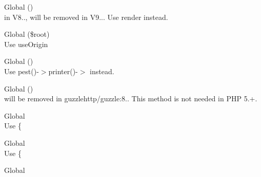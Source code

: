 \begin{DoxyRefList}
\item[Global \doxylink{class_sabberworm_1_1_c_s_s_1_1_value_1_1_u_r_l_a7516ca30af0db3cdbf9a7739b48ce91d}{URL\+::\+\_\+\+\_\+to\+String} ()]\hfill \\
\label{deprecated__deprecated000427}%
%
in V8.., will be removed in V9... Use {\ttfamily render} instead.  
\item[Global \doxylink{class_illuminate_1_1_routing_1_1_url_generator_ad109ef27f934d87ba94e607eb919cdf8}{Url\+Generator\+::force\+Root\+Url} (\$root)]\hfill \\
\label{deprecated__deprecated000123}%
%
Use use\+Origin  
\item[Global \doxylink{class_pest_1_1_pending_calls_1_1_uses_call_a5d9f5a8222144a8fb71f23ab9875eb64}{Uses\+Call\+::compact} ()]\hfill \\
\label{deprecated__deprecated000272}%
%
Use {\ttfamily pest()-\/\texorpdfstring{$>$}{>}printer()-\/\texorpdfstring{$>$}{>}} instead.  
\item[Global \doxylink{class_guzzle_http_1_1_utils_a8163ba6dc6fcafdab0ef2265da6a8382}{Utils\+::default\+Ca\+Bundle} ()]\hfill \\
\label{deprecated__deprecated000093}%
%
 will be removed in guzzlehttp/guzzle\+:8.. This method is not needed in PHP 5.+.  
\item[Global \doxylink{class_ramsey_1_1_uuid_1_1_uuid_a3420ab7662943bd1e6491afa87d75342}{Uuid\+::UUID\+\_\+\+TYPE\+\_\+\+IDENTIFIER} ]\hfill \\
\label{deprecated__deprecated000378}%
%
Use \{ 
\item[Global \doxylink{class_ramsey_1_1_uuid_1_1_uuid_a16c5a6b8bb8801b587740a185dcb697d}{Uuid\+::UUID\+\_\+\+TYPE\+\_\+\+PEABODY} ]\hfill \\
\label{deprecated__deprecated000379}%
%
Use \{ 
\item[Global \doxylink{class_ramsey_1_1_uuid_1_1_uuid_ab43a8de8f13c0abb8d7e66286924f4b2}{Uuid\+::VALID\+\_\+\+PATTERN} ]\hfill \\
\label{deprecated__deprecated000377}%
%

\end{DoxyRefList}
